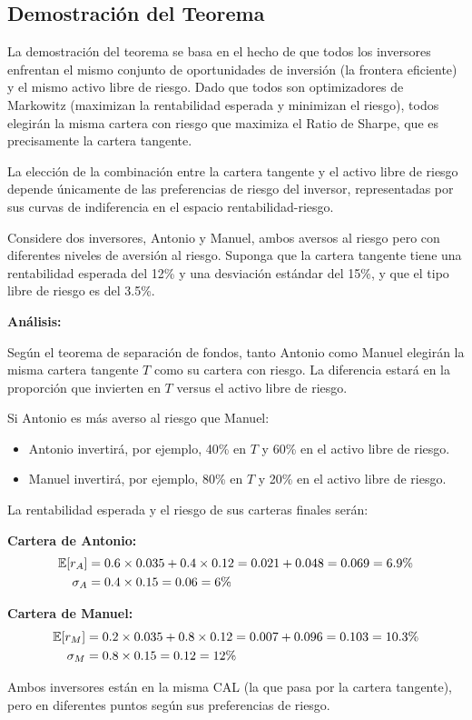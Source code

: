 \subsection{Demostración del Teorema}

La demostración del teorema se basa en el hecho de que todos los inversores enfrentan el mismo conjunto de oportunidades de inversión (la frontera eficiente) y el mismo activo libre de riesgo. Dado que todos son optimizadores de Markowitz (maximizan la rentabilidad esperada y minimizan el riesgo), todos elegirán la misma cartera con riesgo que maximiza el Ratio de Sharpe, que es precisamente la cartera tangente.

La elección de la combinación entre la cartera tangente y el activo libre de riesgo depende únicamente de las preferencias de riesgo del inversor, representadas por sus curvas de indiferencia en el espacio rentabilidad-riesgo.

\begin{ejemplo}
Considere dos inversores, Antonio y Manuel, ambos aversos al riesgo pero con diferentes niveles de aversión al riesgo. Suponga que la cartera tangente tiene una rentabilidad esperada del 12\% y una desviación estándar del 15\%, y que el tipo libre de riesgo es del 3.5\%.

\textbf{Análisis:}

Según el teorema de separación de fondos, tanto Antonio como Manuel elegirán la misma cartera tangente $T$ como su cartera con riesgo. La diferencia estará en la proporción que invierten en $T$ versus el activo libre de riesgo.

Si Antonio es más averso al riesgo que Manuel:
\begin{itemize}
\item Antonio invertirá, por ejemplo, 40\% en $T$ y 60\% en el activo libre de riesgo.
\item Manuel invertirá, por ejemplo, 80\% en $T$ y 20\% en el activo libre de riesgo.
\end{itemize}

La rentabilidad esperada y el riesgo de sus carteras finales serán:

\textbf{Cartera de Antonio:}
\begin{align*}
\mathbb{E}[r_A] &= 0.6 \times 0.035 + 0.4 \times 0.12 = 0.021 + 0.048 = 0.069 = 6.9\% \\
\sigma_A &= 0.4 \times 0.15 = 0.06 = 6\%
\end{align*}

\textbf{Cartera de Manuel:}
\begin{align*}
\mathbb{E}[r_M] &= 0.2 \times 0.035 + 0.8 \times 0.12 = 0.007 + 0.096 = 0.103 = 10.3\% \\
\sigma_M &= 0.8 \times 0.15 = 0.12 = 12\%
\end{align*}

Ambos inversores están en la misma CAL (la que pasa por la cartera tangente), pero en diferentes puntos según sus preferencias de riesgo.
\end{ejemplo}

